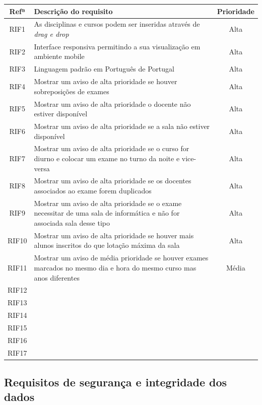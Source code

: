 \documentclass[11pt, twoside]{report}
\begin{document}
		\begin{center}
		\begin{tabularx}{\textwidth}{|c|X|c|}
			\hline
			\textbf{Refª }	& \textbf{Descrição do requisito} & \textbf{Prioridade} \\
			\hline
			RIF1 & As disciplinas e cursos podem ser inseridas através de \textit{drag e drop} &Alta\\
			\hline
			RIF2 & Interface responsiva permitindo a sua visualização em ambiente mobile &Alta\\
			\hline
			RIF3 & Linguagem padrão em Português de Portugal &Alta\\
			\hline
			RIF4 &Mostrar um aviso de alta prioridade se houver sobreposições de exames &Alta\\
			\hline
			RIF5 &Mostrar um aviso de alta prioridade o docente não estiver disponível&Alta\\
			\hline
			RIF6&Mostrar um aviso de alta prioridade se a sala não estiver disponível&Alta\\
			\hline
			RIF7&Mostrar um aviso de alta prioridade se o curso for diurno e colocar um exame no turno da noite e vice-versa & Alta\\
			\hline
			RIF8&Mostrar um aviso de alta prioridade se os docentes associados ao exame forem duplicados& Alta\\
			\hline
			RIF9&Mostrar um aviso de alta prioridade se o exame necessitar de uma sala de informática e não for associada sala desse tipo&Alta\\
			\hline
			RIF10&Mostrar um aviso de alta prioridade se houver mais alunos inscritos do que  lotação máxima da sala&Alta\\
			\hline
			RIF11&Mostrar um aviso de média prioridade se houver exames marcados no mesmo dia e hora do mesmo curso mas anos diferentes&Média\\
			\hline
			RIF12&&\\
			\hline
			RIF13&&\\
			\hline
			RIF14&&\\
			\hline
			RIF15&&\\
			\hline
			RIF16&&\\
			\hline
			RIF17&&\\
			\hline
		\end{tabularx}
		\label{requisitosdeinterface}
	\end{center}
	\subsection{Requisitos de segurança e integridade dos dados}
	
\end{document}
